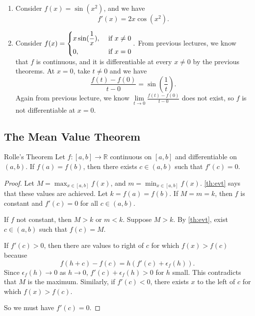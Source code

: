 \begin{example}
    \leavevmode
    \begin{enumerate}
        \item Consider \(f(x) = \sin (x^2)\), and we have
        \[
            f'(x) = 2x \cos (x^2).
        \]
        \item Consider \(f(x) = \begin{dcases}
            x \sin (\frac{1}{x}), &\text{ if }x\neq 0 \\
            0, &\text{ if }x=0 \\
        \end{dcases}.\) From previous lectures, we know that \(f\) is continuous, and it is differentiable at every \(x \neq 0\) by the previous theorems. At \(x = 0\), take \(t \neq 0\) and we have
        \[
            \frac{f(t) - f(0)}{t-0}= \sin(\frac{1}{t}).
        \]
        Again from previous lecture, we know \(\lim\limits_{t \to 0} \frac{f(t) - f(0)}{t-0}\) does not exist, so \(f\) is not differentiable at \(x = 0\).
    \end{enumerate}
\end{example}
\subsection{The Mean Value Theorem}
\leavevmode
\begin{theorem}{Rolle's Theorem}{}
    Let \(f: [a,b] \to \mathbb{R}\) continuous on \([a,b]\) and differentiable on \((a,b)\). If \(f(a) = f(b)\), then there exists \(c \in (a,b)\) such that \(f'(c) = 0\).
\end{theorem}
\begin{proof}
    Let \(M = \mathop{\max}_{x \in [a,b]} f(x)\), and \(m = \mathop{\min}_{x \in [a,b]} f(x)\). \cref{th:evt} says that these values are achieved. Let \(k = f(a) = f(b)\). If \(M = m = k\), then \(f\) is constant and \(f'(c) = 0\) for all \(c \in (a,b)\).

    If \(f\) not constant, then \(M > k\) or \(m < k\). Suppose \(M > k\). By \cref{th:evt}, exist \(c \in (a,b)\) such that \(f(c) = M\).

    If \(f'(c) > 0\), then there are values to right of \(c\) for which \(f(x) > f(c)\) because
    \[f(h + c) - f(c) = h(f'(c) + \epsilon_f(h)).\]
    Since \(\epsilon_f(h) \to 0\) as \(h \to 0\), \(f'(c) + \epsilon_f(h) > 0\) for \(h\) small. This contradicts that \(M\) is the maximum. Similarly, if \(f'(c) < 0\), there exists \(x\) to the left of \(c\) for which \(f(x) > f(c)\).

    So we must have \(f'(c) = 0\).
\end{proof}